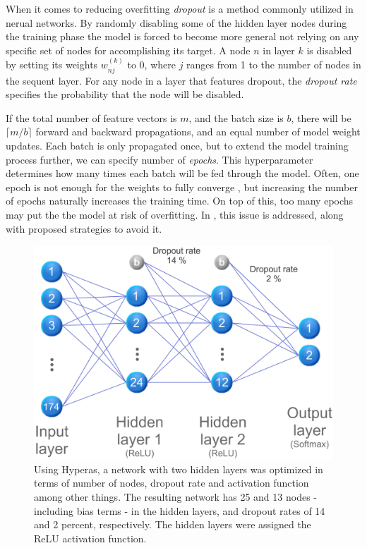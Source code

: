 When it comes to reducing overfitting \emph{dropout} is a method commonly utilized in nerual networks. By randomly disabling some of the hidden layer nodes during the training phase the model is forced to become more general not relying on any specific set of nodes for accomplishing its target. A node $n$ in layer $k$ is disabled by setting its weights $w^{(k)}_{nj}$ to 0, where $j$ ranges from 1 to the number of nodes in the sequent layer. For any node in a layer that features dropout, the \emph{dropout rate} specifies the probability that the node will be disabled.

If the total number of feature vectors is $m$, and the batch size is $b$, there will be $\lceil m/b \rceil$ forward and backward propagations, and an equal number of model weight updates. Each batch is only propagated once, but to extend the model training process further, we can specify number of \emph{epochs}. This hyperparameter determines how many times each batch will be fed through the model. Often, one epoch is not enough for the weights to fully converge \citep{kriesel_2007}, but increasing the number of epochs naturally increases the training time. On top of this, too many epochs may put the the model at risk of overfitting. In \citep{prechelt_2000}, this issue is addressed, along with proposed strategies to avoid it.

\begin{figure}[h]
	\centering
	\includegraphics[scale=0.5]{figs_temp/optimized_network_graph.jpg}
	\caption{Using Hyperas, a network with two hidden layers was optimized in terms of number of nodes, dropout rate and activation function among other things. The resulting network has 25 and 13 nodes - including bias terms - in the hidden layers, and dropout rates of 14 and 2 percent, respectively. The hidden layers were assigned the ReLU activation function.}
	\label{fig:opt_net}
\end{figure}

